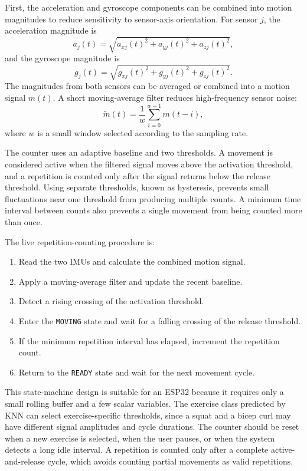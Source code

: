 First, the acceleration and gyroscope components can be combined into motion
magnitudes to reduce sensitivity to sensor-axis orientation. For sensor $j$, the
acceleration magnitude is
\begin{equation}
a_j(t)=\sqrt{a_{xj}(t)^2+a_{yj}(t)^2+a_{zj}(t)^2},
\end{equation}
and the gyroscope magnitude is
\begin{equation}
g_j(t)=\sqrt{g_{xj}(t)^2+g_{yj}(t)^2+g_{zj}(t)^2}.
\end{equation}
The magnitudes from both sensors can be averaged or combined into a motion signal
$m(t)$. A short moving-average filter reduces high-frequency sensor noise:
\begin{equation}
\widetilde{m}(t)=\frac{1}{w}\sum_{i=0}^{w-1}m(t-i),
\end{equation}
where $w$ is a small window selected according to the sampling rate.

The counter uses an adaptive baseline and two thresholds. A movement is considered
active when the filtered signal moves above the activation threshold, and a
repetition is counted only after the signal returns below the release threshold.
Using separate thresholds, known as hysteresis, prevents small fluctuations near one
threshold from producing multiple counts. A minimum time interval between counts
also prevents a single movement from being counted more than once.

The live repetition-counting procedure is:
\begin{enumerate}
	\item Read the two IMUs and calculate the combined motion signal.
	\item Apply a moving-average filter and update the recent baseline.
	\item Detect a rising crossing of the activation threshold.
	\item Enter the \texttt{MOVING} state and wait for a falling crossing of the release threshold.
	\item If the minimum repetition interval has elapsed, increment the repetition count.
	\item Return to the \texttt{READY} state and wait for the next movement cycle.
\end{enumerate}

This state-machine design is suitable for an ESP32 because it requires only a small
rolling buffer and a few scalar variables. The exercise class predicted by KNN can
select exercise-specific thresholds, since a squat and a bicep curl may have
different signal amplitudes and cycle durations. The counter should be reset when a
new exercise is selected, when the user pauses, or when the system detects a long
idle interval. A repetition is counted only after a complete active-and-release
cycle, which avoids counting partial movements as valid repetitions.

